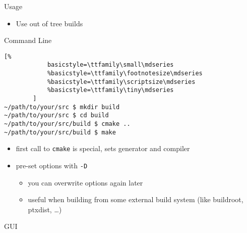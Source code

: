 \documentclass{beamer}
\begin{document}
\begin{frame}[fragile]{Usage}
    \begin{itemize}
        \item Use out of tree builds
    \end{itemize}
    \begin{block}{Command Line}
        \begin{lstlisting}[%
            basicstyle=\ttfamily\small\mdseries
            %basicstyle=\ttfamily\footnotesize\mdseries
            %basicstyle=\ttfamily\scriptsize\mdseries
            %basicstyle=\ttfamily\tiny\mdseries
        ]
~/path/to/your/src $ mkdir build
~/path/to/your/src $ cd build
~/path/to/your/src/build $ cmake ..
~/path/to/your/src/build $ make
        \end{lstlisting}
    \end{block}
    \begin{itemize}
        \item first call to \texttt{cmake} is special, sets generator and compiler
        \item pre-set options with \texttt{-D}
            \begin{itemize}
                \item you can overwrite options again later
                \item useful when building from some external build system (like buildroot, ptxdist, …)
            \end{itemize}
    \end{itemize}
\end{frame}

\begin{frame}{GUI}
\end{frame}
\end{document}
